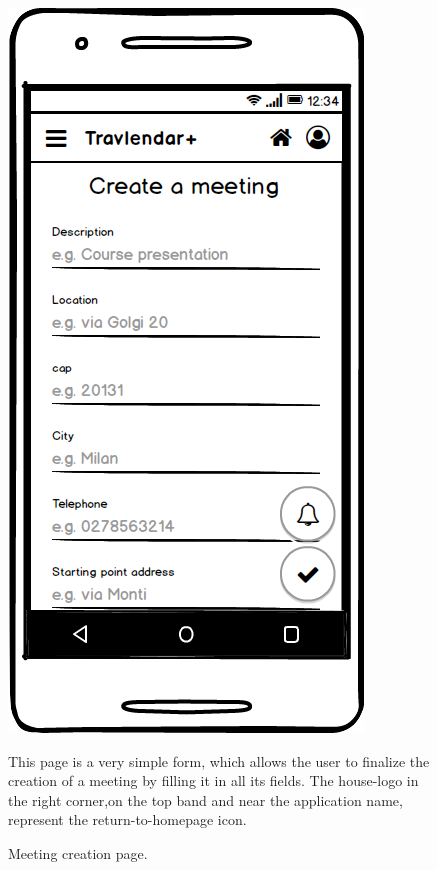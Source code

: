 \documentclass[11pt]{article}
\begin{document}
	\begin{figure}
		\centering
		\includegraphics[width=0.7\linewidth]{CreateMeeting.png}
		\caption{Meeting creation page.}
		\label{fig:createmeeting}
		\begin{center}
			This page is a very simple form, which allows the user to finalize the creation of a meeting by filling it in all its fields. 
			The house-logo in the  right corner,on the top band and near the application name, represent the return-to-homepage icon. 
		\end{center}
	\end{figure}
\end{document}
